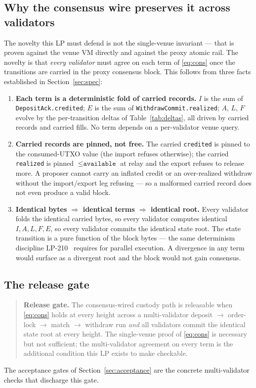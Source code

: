\subsection{Why the consensus wire preserves it across validators}

The novelty this LP must defend is not the single-venue invariant ---
that is proven against the venue VM directly and against the proxy
atomic rail. The novelty is that \emph{every validator} must agree on
each term of \eqref{eq:cons} once the transitions are carried in the
proxy consensus block. This follows from three facts established in
Section~\ref{sec:spec}:

\begin{enumerate}[leftmargin=2em,nosep]
\item \textbf{Each term is a deterministic fold of carried records.}
  $I$ is the sum of \texttt{DepositAck.credited}; $E$ is the sum of
  \texttt{WithdrawCommit.realized}; $A$, $L$, $F$ evolve by the
  per-transition deltas of Table~\ref{tab:deltas}, all driven by carried
  records and carried fills. No term depends on a per-validator venue
  query.
\item \textbf{Carried records are pinned, not free.} The carried
  \texttt{credited} is pinned to the consumed-UTXO value (the import
  refuses otherwise); the carried \texttt{realized} is pinned $\le
  \texttt{available}$ at relay and the export refuses to release more.
  A proposer cannot carry an inflated credit or an over-realized
  withdraw without the import/export leg refusing --- so a malformed
  carried record does not even produce a valid block.
\item \textbf{Identical bytes $\Rightarrow$ identical terms $\Rightarrow$
  identical root.} Every validator folds the identical carried bytes, so
  every validator computes identical $I, A, L, F, E$, so every validator
  commits the identical state root. The state transition is a pure
  function of the block bytes --- the same determinism discipline
  LP-210~\cite{lp210} requires for parallel execution. A divergence in
  any term would surface as a divergent root and the block would not
  gain consensus.
\end{enumerate}

\subsection{The release gate}

\begin{quote}
\textbf{Release gate.} The consensus-wired custody path is releasable
when \eqref{eq:cons} holds at every height across a multi-validator
deposit $\to$ order-lock $\to$ match $\to$ withdraw run \emph{and} all
validators commit the identical state root at every height. The
single-venue proof of \eqref{eq:cons} is necessary but not sufficient;
the multi-validator agreement on every term is the additional condition
this LP exists to make checkable.
\end{quote}

The acceptance gates of Section~\ref{sec:acceptance} are the concrete
multi-validator checks that discharge this gate.
